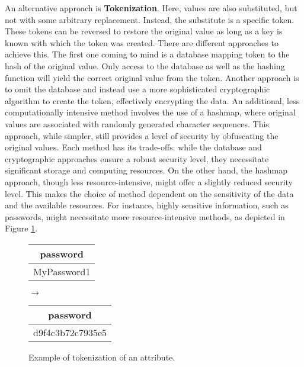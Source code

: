 An alternative approach is \textbf{Tokenization}. Here, values are also substituted, but not with some arbitrary replacement. Instead, the substitute is a specific token. These tokens can be reversed to restore the original value as long as a key is known with which the token was created. There are different approaches to achieve this. The first one coming to mind is a database mapping token to the hash of the original value. Only access to the database as well as the hashing function will yield the correct original value from the token. Another approach is to omit the database and instead use a more sophisticated cryptographic algorithm to create the token, effectively encrypting the data. An additional, less computationally intensive method involves the use of a hashmap, where original values are associated with randomly generated character sequences. This approach, while simpler, still provides a level of security by obfuscating the original values. Each method has its trade-offs: while the database and cryptographic approaches ensure a robust security level, they necessitate significant storage and computing resources. On the other hand, the hashmap approach, though less resource-intensive, might offer a slightly reduced security level. This makes the choice of method dependent on the sensitivity of the data and the available resources. For instance, highly sensitive information, such as passwords, might necessitate more resource-intensive methods, as depicted in Figure \ref{fig:tokenization}.

\bigskip

\begin{figure}[ht]
    \begin{center}
    \footnotesize{
        \renewcommand{\arraystretch}{1.5}
        \begin{tabular}{|c|}
            \hline
            password \\
            \hline
            MyPassword1 \\
            \hline
            \end{tabular}
            \quad $\longrightarrow$ \quad
            \begin{tabular}{|c|}
            \hline
            password \\
            \hline
            d9f4c3b72c7935e5 \\
            \hline
        \end{tabular}
    }
    \end{center}
    \caption{Example of tokenization of an attribute.\label{fig:tokenization}}
\end{figure}

